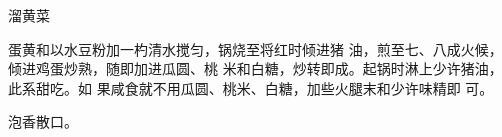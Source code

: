 \begin{recipe}{溜黄菜}

\ingredients


\cooking

蛋黄和以水豆粉加一杓清水搅匀，锅烧至将红时倾进猪 油，煎至七、八成火候，倾进鸡蛋炒熟，随即加进瓜圆、桃 米和白糖，炒转即成。起锅时淋上少许猪油，此系甜吃。如 果咸食就不用瓜圆、桃米、白糖，加些火腿末和少许味精即 可。

\notes

泡香散口。

\end{recipe}

